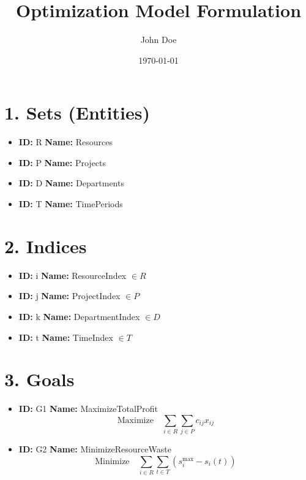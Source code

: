 \documentclass{article}
\title{Optimization Model Formulation}
\author{John Doe}
\date{\today}
\begin{document}
\maketitle
\tableofcontents
\newpage

\section{1. Sets (Entities)}
\begin{itemize}
    \item \textbf{ID:} R \textbf{Name:} Resources
    \item \textbf{ID:} P \textbf{Name:} Projects
    \item \textbf{ID:} D \textbf{Name:} Departments
    \item \textbf{ID:} T \textbf{Name:} TimePeriods
\end{itemize}

\section{2. Indices}
\begin{itemize}
    \item \textbf{ID:} i \textbf{Name:} ResourceIndex $\in R$
    \item \textbf{ID:} j \textbf{Name:} ProjectIndex $\in P$
    \item \textbf{ID:} k \textbf{Name:} DepartmentIndex $\in D$
    \item \textbf{ID:} t \textbf{Name:} TimeIndex $\in T$
\end{itemize}

\section{3. Goals}
\begin{itemize}
    \item \textbf{ID:} G1 \textbf{Name:} MaximizeTotalProfit
    \begin{equation}
        \text{Maximize} \quad \sum_{i \in R} \sum_{j \in P} c_{ij} x_{ij}
    \end{equation}
    \item \textbf{ID:} G2 \textbf{Name:} MinimizeResourceWaste
    \begin{equation}
        \text{Minimize} \quad \sum_{i \in R} \sum_{t \in T} \left( s_i^{\text{max}} - s_i(t) \right)
    \end{equation}
\end{itemize}
\end{document}
